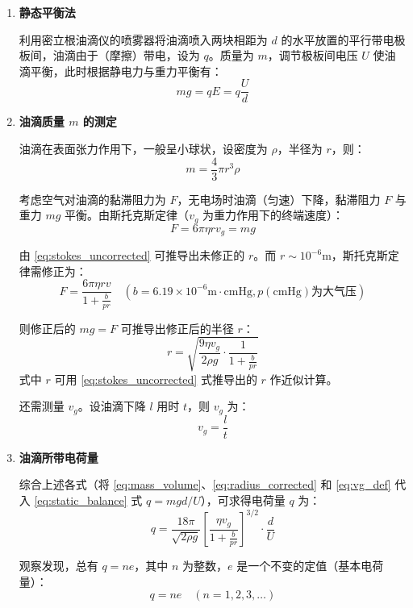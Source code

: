 \documentclass[yuxi]{../template/Report}%
\begin{document}
\begin{enumerate}
    \item \textbf{静态平衡法}

    利用密立根油滴仪的喷雾器将油滴喷入两块相距为 $d$ 的水平放置的平行带电极板间，油滴由于（摩擦）带电，设为 $q$。质量为 $m$，调节极板间电压 $U$ 使油滴平衡，此时根据静电力与重力平衡有：
    \begin{equation}
        mg = qE = q\frac{U}{d} \label{eq:static_balance}
    \end{equation}

    \item \textbf{油滴质量 $m$ 的测定}

    油滴在表面张力作用下，一般呈小球状，设密度为 $\rho$，半径为 $r$，则：
    \begin{equation}
        m = \frac{4}{3}\pi r^3 \rho \label{eq:mass_volume}
    \end{equation}

    考虑空气对油滴的黏滞阻力为 $F$，无电场时油滴（匀速）下降，黏滞阻力 $F$ 与重力 $mg$ 平衡。由斯托克斯定律（$v_g$ 为重力作用下的终端速度）：
    \begin{equation}
        F = 6\pi\eta rv_g = mg \label{eq:stokes_uncorrected}
    \end{equation}

    由 \cref{eq:stokes_uncorrected} 可推导出未修正的 $r$。而 $r \sim 10^{-6} \text{m}$，斯托克斯定律需修正为：
    \begin{equation}
        F = \frac{6\pi\eta rv}{1 + \frac{b}{pr}} \quad (b=6.19 \times 10^{-6} \text{m} \cdot \text{cmHg}, p(\text{cmHg}) \text{为大气压}) \label{eq:stokes_corrected_F}
    \end{equation}

    则修正后的 $mg = F$ 可推导出修正后的半径 $r$：
    \begin{equation}
        r = \sqrt{\frac{9\eta v_g}{2\rho g} \cdot \frac{1}{1 + \frac{b}{pr}}} \label{eq:radius_corrected}
    \end{equation}
    式中 $r$ 可用 \cref{eq:stokes_uncorrected} 式推导出的 $r$ 作近似计算。

    还需测量 $v_g$。设油滴下降 $l$ 用时 $t$，则 $v_g$ 为：
    \begin{equation}
        v_g = \frac{l}{t} \label{eq:vg_def}
    \end{equation}

    \item \textbf{油滴所带电荷量}

    综合上述各式（将 \cref{eq:mass_volume}、\cref{eq:radius_corrected} 和 \cref{eq:vg_def} 代入 \cref{eq:static_balance} 式 $q = mgd/U$），可求得电荷量 $q$ 为：
    \begin{equation}
        q = \frac{18\pi}{\sqrt{2\rho g}} \left[ \frac{\eta v_g}{1+\frac{b}{pr}} \right]^{3/2} \cdot \frac{d}{U} \label{eq:charge_final}
    \end{equation}

    观察发现，总有 $q = ne$，其中 $n$ 为整数，$e$ 是一个不变的定值（基本电荷量）：
    \begin{equation}
        q = ne \quad (n=1, 2, 3, \dots) \label{eq:charge_quantization}
    \end{equation}

\end{enumerate}
\end{document}
